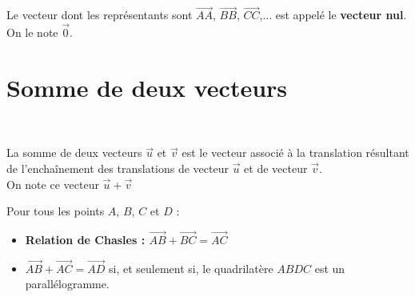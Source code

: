 \begin{Définition}
Le vecteur dont les représentants sont $\overrightarrow{AA}$, $\overrightarrow{BB}$, $\overrightarrow{CC}$,$\ldots$ est appelé le {\bf{vecteur nul}}.\\
 On le note $\overrightarrow{0}$.

\end{Définition}

\section{Somme de deux vecteurs}

\begin{Définition} $ $\\
\vspace{-0.5cm}
\begin{minipage}[c]{0.68\linewidth}
La somme de deux vecteurs $\overrightarrow{u}$ et $\overrightarrow{v}$ est le vecteur associé à la translation résultant de l'enchaînement des translations de vecteur $\overrightarrow{u}$ et de vecteur $\overrightarrow{v}$. \\On note ce vecteur $\overrightarrow{u}+\overrightarrow{v}$ 
\end{minipage} \hfill
\begin{minipage}[c]{0.26\linewidth}
\begin{center}
\end{center}
\end{minipage}
\vspace{0.5cm}
\end{Définition}

\newpage

\begin{Théorème}
Pour tous les points $A$, $B$, $C$ et $D$ : 
\begin{itemize}[label=\textcolor{Couleur1}{$\bullet$}]
\item {\bf{Relation de Chasles : }} $\overrightarrow{AB}+\overrightarrow{BC}=\overrightarrow{AC}$
\item $\overrightarrow{AB}+\overrightarrow{AC}=\overrightarrow{AD}$ si, et seulement si, le quadrilatère $ABDC$ est un parallélogramme.
\end{itemize}

\end{Théorème}


